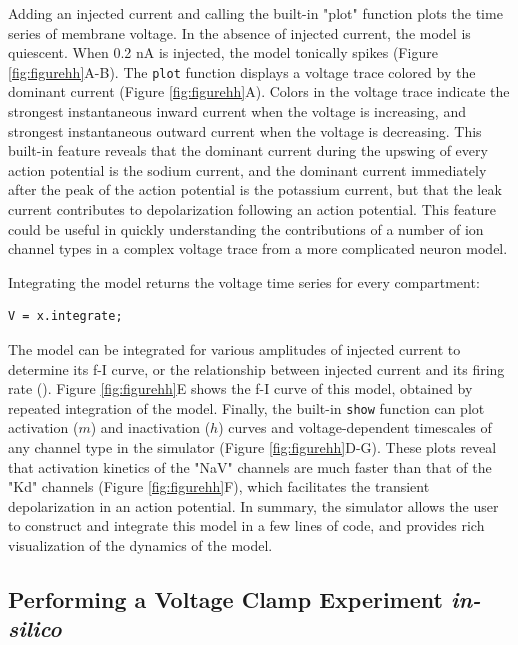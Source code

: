 \documentclass{frontiersSCNS} %
\begin{document}
Adding an injected current and calling the built-in "plot" function plots the time series of membrane voltage. In the absence of injected current, the model is quiescent. When 0.2 nA is injected, the model tonically spikes (Figure \ref{fig:figurehh}A-B).  The \texttt{plot} function displays a voltage trace colored by the dominant current (Figure \ref{fig:figurehh}A). Colors in the voltage trace indicate the strongest instantaneous inward current when the voltage is increasing, and strongest instantaneous outward current when the voltage is decreasing. This built-in feature reveals that the dominant current during the upswing of every action potential is the sodium current, and the dominant current immediately after the peak of the action potential is the potassium current, but that the leak current contributes to depolarization following an action potential. This feature could be useful in quickly understanding the contributions of a number of ion channel types in a complex voltage trace from a more complicated neuron model.

Integrating the model returns the voltage time series for every compartment:

\begin{lstlisting}[style=Matlab-editor]
V = x.integrate;
\end{lstlisting}

The model can be integrated for various amplitudes of injected current to determine its f-I curve, or the relationship between injected current and its firing rate (\cite{kisperskyIncreaseSodiumConductance2012}). Figure \ref{fig:figurehh}E shows the f-I curve of this model, obtained by repeated integration of the model.  Finally, the built-in \texttt{show} function can plot activation ($m$) and inactivation ($h$) curves and voltage-dependent timescales of any channel type in the simulator (Figure \ref{fig:figurehh}D-G). These plots reveal that activation kinetics of the "NaV" channels are much faster than that of the "Kd" channels (Figure \ref{fig:figurehh}F), which facilitates the transient depolarization in an action potential. In summary, the simulator allows the user to construct and integrate this model in a few lines of code, and provides rich visualization of the dynamics of the model.


%
%
%
%
%
%




\subsection{Performing a Voltage Clamp Experiment \textit{in-silico}}
\end{document}

